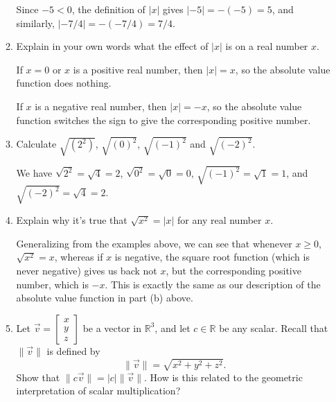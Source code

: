 \documentclass[12pt]{article}
\newcommand{\abs}[1]{\lvert #1\rvert}
\newcommand{\len}[1]{\lVert #1\rVert}
\newcommand{\R}{\mathbb{R}}
\begin{document}
\begin{enumerate}
\begin{enumerate}
Since $-5<0$, the definition of $\abs{x}$ gives $\abs{-5} = -(-5) = 5$, and similarly, $\abs{-7/4} = -(-7/4) = 7/4$.

\bigskip

 \item Explain in your own words what the effect of $\abs{x}$ is on a real number $x$.

\bigskip

If $x=0$ or $x$ is a positive real number, then $\abs{x}=x$, so the absolute value function does nothing.

If $x$ is a negative real number, then $\abs{x} = -x$, so the absolute value function switches the sign to give the corresponding positive number.

\bigskip

 \item Calculate $\sqrt{(2^2)}$, $\sqrt{(0)^2}$, $\sqrt{(-1)^2}$ and $\sqrt{(-2)^2}$. 

\bigskip

We have $\sqrt{2^2} = \sqrt{4} = 2$, $\sqrt{0^2} = \sqrt{0} = 0$, $\sqrt{(-1)^2} = \sqrt{1} = 1$, and $\sqrt{(-2)^2} = \sqrt{4} = 2$.

\bigskip

 \item Explain why it's true that $\sqrt{x^2} = \abs{x}$ for any real number $x$.

\bigskip

Generalizing from the examples above, we can see that whenever $x\geq 0$, $\sqrt{x^2} = x$, whereas if $x$ is negative, the square root function (which is never negative) gives us back not $x$, but the corresponding positive number, which is $-x$. This is exactly the same as our description of the absolute value function in part (b) above.

\bigskip

 \item Let $\vec{v} = \begin{bmatrix}x\\y\\z\end{bmatrix}$ be a vector in $\R^3$, and let $c\in \R$ be any scalar. Recall that $\len{\vec{v}}$ is defined by
\[
 \len{\vec{v}} = \sqrt{x^2+y^2+z^2}.
\]
Show that $\len{c\vec{v}} = \abs{c}\len{\vec{v}}$. How is this related to the geometric interpretation of scalar multiplication?

\bigskip


\end{enumerate}
\end{enumerate}
\end{document}
